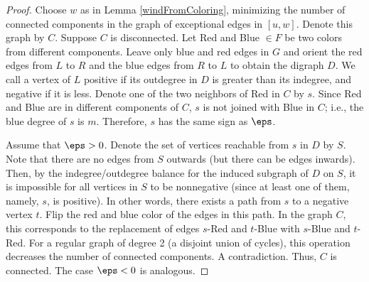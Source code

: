 \documentclass[12pt]{article}
\newtheorem{prop}{Proposition}[section]
\theoremstyle{definition}
\theoremstyle{plain}
\newtheorem{definition}{Definition}[section]
\begin{document}
\begin{proof}
Choose $w$ as in Lemma \ref{windFromColoring}, minimizing the number of connected components in the graph of exceptional edges in $[u,w]$. Denote this graph by $C$. Suppose $C$ is disconnected. Let Red and Blue $\in F$ be two colors from different components. Leave only blue and red edges in $G$ and orient the red edges from $L$ to $R$ and the blue edges from $R$ to $L$ to obtain the digraph $D$. We call a vertex of $L$ positive if its outdegree in $D$ is greater than its indegree, and negative if it is less. Denote one of the two neighbors of Red in $C$ by $s$. Since Red and Blue are in different components of $C$, $s$ is not joined with Blue in $C$; i.e., the blue degree of $s$ is $m$. Therefore, $s$ has the same sign as $\eps$.

Assume that $\eps>0$.
Denote the set of vertices reachable from $s$ in $D$ by $S$.
Note that there are no edges from $S$ outwards (but there can be edges inwards). 
Then, by the indegree/outdegree balance for the induced subgraph of $D$ on $S$, it is impossible for all vertices in $S$ to
be nonnegative (since at least one of them, namely, $s$, is positive). In other words, there exists a path from $s$ to a negative vertex $t$. Flip the red and blue color of the edges in this path. 
In the graph $C$, this corresponds to the replacement of edges $s$-Red and $t$-Blue with $s$-Blue and $t$-Red. For a regular graph of degree 2 (a disjoint union of cycles), this operation decreases the number of connected components. A contradiction. 
Thus, $C$ is connected. The case $\eps<0$ is analogous. 
\end{proof}





\end{document}
